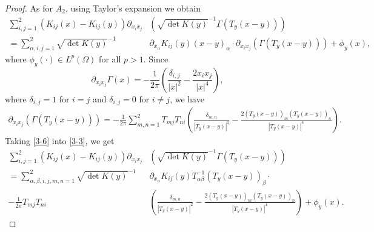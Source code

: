 \documentclass[12pt,reqno]{amsart}
\numberwithin{equation}{section}
\theoremstyle{definition}
\theoremstyle{remark}
\begin{document}
\begin{proof}
	As for $ A_2 $, using Taylor's expansion we obtain
	\begin{equation}\label{3-3}
	\begin{split}
	\sum_{i,j=1}^2\left( K_{ij}(x)-K_{ij}(y)\right) \partial_{x_ix_j}&\left(\sqrt{\det K(y)}^{-1}\Gamma\left (T_y(x-y)\right ) \right)\\
	=\sum_{\alpha,i,j=1}^2\sqrt{\det K(y)}^{-1}&\partial_{x_\alpha}K_{ij}(y) (x-y)_\alpha\cdot\partial_{x_ix_j}\left( \Gamma\left (T_y(x-y)\right ) \right)+\phi_y(x),
	\end{split}
	\end{equation}
	where $ \phi_y(\cdot)\in L^p(\Omega) $ for all $ p>1. $
	Since
	\begin{equation*}
	\partial_{x_ix_j}\Gamma(x)=-\frac{1}{2\pi}\left(\frac{\delta_{i,j}}{|x|^2}-\frac{2x_ix_j}{|x|^4} \right),
	\end{equation*}
	where $ \delta_{i,j}=1 $ for $ i=j $ and $ \delta_{i,j}=0 $ for $ i\neq j $, we have
	\begin{equation}\label{3-6}
	\begin{split}
	\partial_{x_ix_j}\left( \Gamma(T_y(x-y))\right) =-\frac{1}{2\pi}\sum_{m,n=1}^2T_{mj}T_{ni}\left(\frac{\delta_{m,n}}{|T_y(x-y)|^2}-\frac{2\left( T_y(x-y)\right)_m\left( T_y(x-y)\right)_n}{|T_y(x-y)|^4} \right).
	\end{split}
	\end{equation}
	Taking \eqref{3-6} into \eqref{3-3}, we get
	\begin{equation}\label{3-7}
	\begin{split}
	\sum_{i,j=1}^2\left( K_{ij}(x)-K_{ij}(y)\right) \partial_{x_ix_j}&\left(\sqrt{\det K(y)}^{-1}\Gamma\left (T_y(x-y)\right ) \right)\\
	=\sum_{\alpha,\beta,i,j,m,n=1}^2\sqrt{\det K(y)}^{-1}&\partial_{x_\alpha}K_{ij}(y)T^{-1}_{\alpha\beta} \left (T_y(x-y)\right )_\beta\cdot  \\ -\frac{1}{2\pi}T_{mj}T_{ni}&\left(\frac{\delta_{m,n}}{|T_y(x-y)|^2}-\frac{2\left( T_y(x-y)\right)_m\left( T_y(x-y)\right)_n}{|T_y(x-y)|^4} \right)  +\phi_y(x).
	\end{split}
	\end{equation}
	
	
	

\end{proof}
\end{document}
